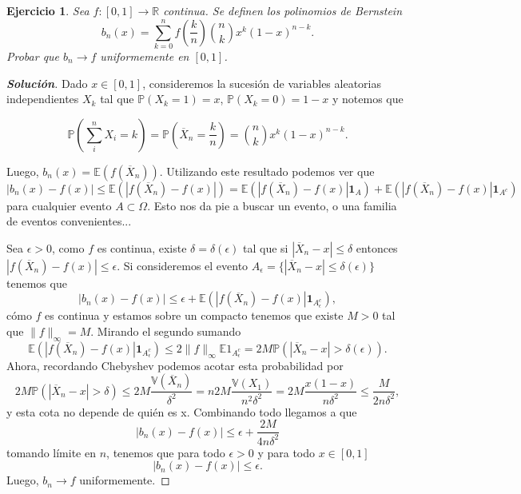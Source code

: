 \documentclass[11pt]{article}
\theoremstyle{ejstyle}
\newtheorem{ejercicio}{Ejercicio}
\newenvironment{solucion}
{\begin{proof}[{\bfseries\color{deepindigo} Solución}]}
	{\end{proof}}
\begin{document}
	\begin{ejercicio}
		Sea $f: [0, 1] \to \mathbb{R}$ continua. Se definen los polinomios de Bernstein
		$$
		b_n(x) = \sum_{k=0}^{n} f\left(\frac{k}{n}\right) 	\binom{n}{k} x^k (1-x)^{n-k}.
		$$
		Probar que $b_n \to f$ uniformemente en $[0, 1]$.
	\end{ejercicio}
	
	\begin{solucion}
		
		Dado $x \in [0, 1]$, consideremos la sucesión de variables aleatorias independientes $X_k$ tal que $\mathbb{P}(X_k = 1) = x$, $\mathbb{P}(X_k = 0) = 1 - x$ y notemos que
		
		$$ \mathbb{P}(\sum_{i}^{n} {X}_i = k) = \mathbb{P}(\overline{X}_n = \frac{k}{n}) = \binom{n}{k} x^k (1-x)^{n-k}.$$
		
		\noindent Luego, $b_n(x) = \mathbb{E}(f(\overline{X}_n))$. Utilizando este resultado podemos ver que
		$$
		|b_n(x) - f(x)| \leq \mathbb{E}(|f(\overline{X}_n) - f(x)|) = \mathbb{E}(|f(\overline{X}_n) - f(x)|\mathbf{1}_A) + \mathbb{E}(|f(\overline{X}_n) - f(x)|\mathbf{1}_{A^c})
		$$
		para cualquier evento $A \subset \Omega$. Esto nos da pie a buscar un evento, o una familia de eventos convenientes...
		
		Sea $\epsilon > 0$, como $f$ es continua, existe $\delta = \delta (\epsilon) $ tal que si $|\overline{X}_n - x| \leq \delta$ entonces $|f(\overline{X}_n) - f(x)| \leq \epsilon$. Si consideremos el evento $A_{\epsilon} = \{|\overline{X}_n - x| \leq \delta(\epsilon) \} $ tenemos que
		$$
		|b_n(x) - f(x)| \leq \epsilon + \mathbb{E}(|f(\overline{X}_n) - f(x)|\mathbf{1}_{A_{\epsilon}^{c}}),
		$$
		\noindent cómo $f$ es continua y estamos sobre un compacto tenemos que existe $M > 0$ tal que $\|f\|_{\infty} = M$. Mirando el segundo sumando  
		$$
		\mathbb{E}(|f(\overline{X}_n) - f(x)|\mathbf{1}_{A_{\epsilon}^{c}})
		\leq 2\|f\|_{\infty} \mathbb{E}1_{A_{\epsilon}^{c}} = 2M \mathbb{P}(|\overline{X}_n - x| > \delta (\epsilon)). 
		$$
		Ahora, recordando Chebyshev podemos acotar esta probabilidad por
		$$
		2M\mathbb{P}(|\overline{X}_n - x| > \delta) \leq 2M\frac{\mathbb{V}(\overline{X}_n)}{\delta^2} = n 2M\frac{\mathbb{V}(X_1)}{n^2 \delta^2} = 2M\frac{x(1-x)}{n \delta^2} \leq \frac{M}{2n\delta^2},
		$$
		\noindent y esta cota no depende de quién es x. Combinando todo llegamos a que 
		$$
		|b_n(x) - f(x)| \leq \epsilon + \frac{2M}{4n\delta^2}
		$$
		tomando límite en $n$, tenemos que para todo $\epsilon > 0$ y para todo $x \in [0, 1]$ 
		$$ |b_n(x) - f(x)| \leq \epsilon.$$
		Luego, $b_n \to f$ uniformemente.
	\end{solucion}
\end{document}
